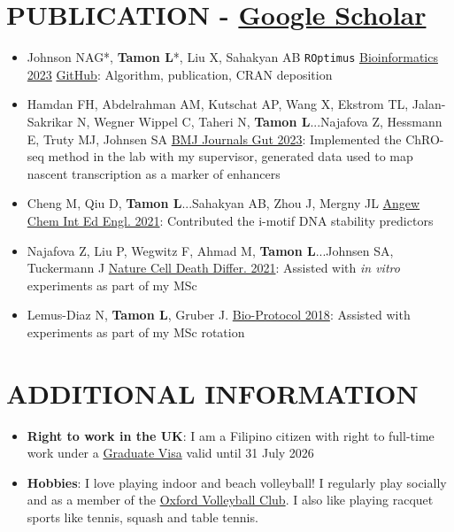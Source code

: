 \documentclass{article}
\newcommand{\resumeItem}[2]{
  \item\small{
    \textbf{#1}{: #2 \vspace{-2pt}}
  }
}
\newcommand{\resumeSubItem}[2]{\resumeItem{#1}{#2}\vspace{-4pt}}
\newcommand{\resumeSubHeadingListStart}{\begin{itemize}[leftmargin=*]}
\newcommand{\resumeSubHeadingListEnd}{\end{itemize}}
\begin{document}
\section{PUBLICATION - \href{https://scholar.google.com/citations?user=XYWobTUAAAAJ&hl=en}{Google Scholar}}
    \begin{itemize}
        \item {Johnson NAG*, \textbf{Tamon L}*, Liu X, Sahakyan AB \texttt{ROptimus} \href{https://doi.org/10.1093/bioinformatics/btad292}{Bioinformatics 2023} \href{https://github.com/SahakyanLab/ROptimus}{GitHub}: Algorithm, publication, CRAN deposition} %

            \item {Hamdan FH, Abdelrahman AM, Kutschat AP, Wang X, Ekstrom TL, Jalan-Sakrikar N, Wegner Wippel C, Taheri N, \textbf{Tamon L}...Najafova Z, Hessmann E, Truty MJ, Johnsen SA \href{http://dx.doi.org/10.1136/gutjnl-2022-328154}{BMJ Journals Gut 2023}: Implemented the ChRO-seq method in the lab with my supervisor, generated data used to map nascent transcription as a marker of enhancers}

            \item {Cheng M, Qiu D, \textbf{Tamon L}...Sahakyan AB, Zhou J, Mergny JL \href{https://doi.org/10.1002/anie.202016801}{Angew Chem Int Ed Engl. 2021}: Contributed the i-motif DNA stability predictors}

            \item {Najafova Z, Liu P, Wegwitz F, Ahmad M, \textbf{Tamon L}...Johnsen SA, Tuckermann J \href{https://doi.org/10.1038/s41418-020-00614-w}{Nature Cell Death Differ. 2021}: Assisted with \textit{in vitro} experiments as part of my MSc}
            
            \item {Lemus-Diaz N, \textbf{Tamon L}, Gruber J. \href{https://doi.org/10.21769/BioProtoc.3000}{Bio-Protocol 2018}: Assisted with experiments as part of my MSc rotation}
    \end{itemize}
          
\section{ADDITIONAL INFORMATION}
  \resumeSubHeadingListStart
    \resumeSubItem{Right to work in the UK}{I am a Filipino citizen with right to full-time work under a \href{https://www.gov.uk/graduate-visa}{Graduate Visa} valid until 31 July 2026}
    \resumeSubItem{Hobbies}
    {I love playing indoor and beach volleyball! I regularly play socially and as a member of the \href{http://www.oxfordvolleyball.co.uk}{Oxford Volleyball Club}. I also like playing racquet sports like tennis, squash and table tennis.}
  \resumeSubHeadingListEnd
\end{document}
